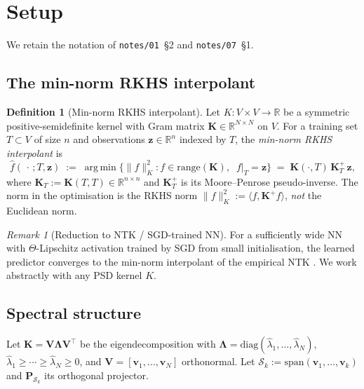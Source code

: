 \documentclass[11pt,a4paper]{article}
\theoremstyle{plain}
\theoremstyle{definition}
\newtheorem{definition}[theorem]{Definition}
\theoremstyle{remark}
\newtheorem{remark}[theorem]{Remark}
\newcommand{\bP}{\mathbf{P}}
\newcommand{\bK}{\mathbf{K}}
\newcommand{\bV}{\mathbf{V}}
\newcommand{\bLambda}{\boldsymbol{\Lambda}}
\newcommand{\bv}{\mathbf{v}}
\newcommand{\bz}{\mathbf{z}}
\newcommand{\R}{\mathbb{R}}
\newcommand{\Scal}{\mathcal{S}}
\newcommand{\range}{\mathrm{range}}
\DeclareMathOperator*{\argmin}{arg\,min}
\begin{document}
\section{Setup}
\label{sec:setup}

We retain the notation of \texttt{notes/01}~\S2 and
\texttt{notes/07}~\S1.

\subsection{The min-norm RKHS interpolant}

\begin{definition}[Min-norm RKHS interpolant]
\label{def:min-norm-interp}
Let $K : V \times V \to \R$ be a symmetric positive-semidefinite
kernel with Gram matrix $\bK \in \R^{N \times N}$ on $V$. For a
training set $T \subset V$ of size $n$ and observations $\bz \in \R^n$
indexed by $T$, the \emph{min-norm RKHS interpolant} is
\begin{equation}
    \hat f(\,\cdot\,; T, \bz)
    \;:=\; \argmin\!\big\{\|f\|_K^2 : f \in \range(\bK),\;\; f|_T = \bz\big\}
    \;=\; \bK(\cdot, T)\,\bK_T^{+}\,\bz,
    \label{eq:min-norm-interp}
\end{equation}
where $\bK_T := \bK(T, T) \in \R^{n \times n}$ and $\bK_T^+$ is its
Moore--Penrose pseudo-inverse. The norm in the optimisation is the
RKHS norm $\|f\|_K^2 := \langle f, \bK^+ f\rangle$, \emph{not} the
Euclidean norm.
\end{definition}

\begin{remark}[Reduction to NTK / SGD-trained NN]
\label{rem:ntk-reduction}
For a sufficiently wide NN with $\Theta$-Lipschitz activation
trained by SGD from small initialisation, the learned predictor
converges to the min-norm interpolant of the empirical NTK
\citep{JacotGabrielHongler2018,LeeXiaoSchoenholzBahriNovakSohlDicksteinPennington2019}.
We work abstractly with any PSD kernel $K$.
\end{remark}

\subsection{Spectral structure}

Let $\bK = \bV\bLambda\bV^\top$ be the eigendecomposition with
$\bLambda = \mathrm{diag}(\hat\lambda_1, \ldots, \hat\lambda_N)$,
$\hat\lambda_1 \ge \cdots \ge \hat\lambda_N \ge 0$, and
$\bV = [\bv_1, \ldots, \bv_N]$ orthonormal. Let
$\Scal_k := \mathrm{span}(\bv_1, \ldots, \bv_k)$ and $\bP_{\Scal_k}$
its orthogonal projector.
\end{document}
